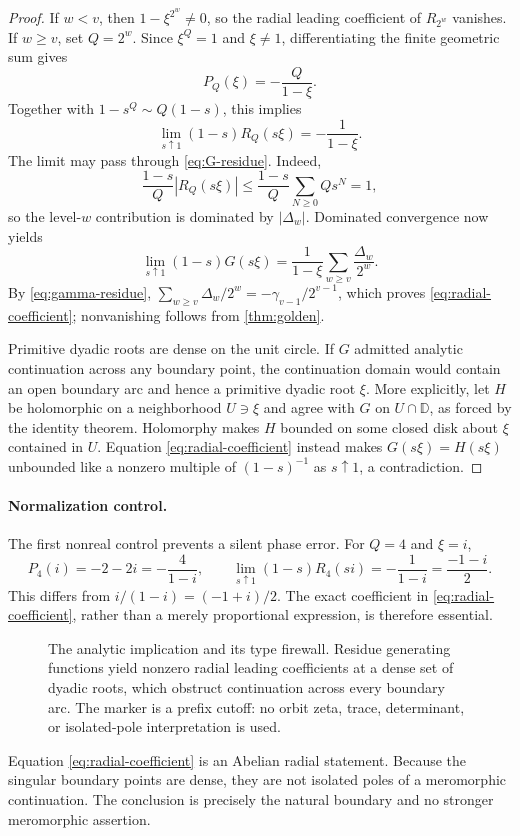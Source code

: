 \begin{proof}
If \(w<v\), then \(1-\xi^{2^w}\ne0\), so the radial leading coefficient
of \(R_{2^w}\) vanishes.  If \(w\ge v\), set \(Q=2^w\).  Since
\(\xi^Q=1\) and \(\xi\ne1\), differentiating the finite geometric sum gives
\[
  P_Q(\xi)=-\frac{Q}{1-\xi}.
\]
Together with \(1-s^Q\sim Q(1-s)\), this implies
\begin{equation}
  \lim_{s\uparrow1}(1-s)R_Q(s\xi)=-\frac1{1-\xi}.
  \label{eq:residue-radial}
\end{equation}
The limit may pass through \eqref{eq:G-residue}.  Indeed,
\[
  \frac{1-s}{Q}|R_Q(s\xi)|
  \le\frac{1-s}{Q}\sum_{N\ge0}Qs^N=1,
\]
so the level-\(w\) contribution is dominated by \(|\Delta_w|\).  Dominated
convergence now yields
\[
  \lim_{s\uparrow1}(1-s)G(s\xi)
  =\frac1{1-\xi}\sum_{w\ge v}\frac{\Delta_w}{2^w}.
\]
By \eqref{eq:gamma-residue},
\(\sum_{w\ge v}\Delta_w/2^w=-\gamma_{v-1}/2^{v-1}\), which proves
\eqref{eq:radial-coefficient}; nonvanishing follows from
\cref{thm:golden}.

Primitive dyadic roots are dense on the unit circle.  If \(G\) admitted
analytic continuation across any boundary point, the continuation domain
would contain an open boundary arc and hence a primitive dyadic root
\(\xi\).  More explicitly, let \(H\) be holomorphic on a neighborhood
\(U\ni\xi\) and agree with \(G\) on \(U\cap\mathbb D\), as forced by the
identity theorem.  Holomorphy makes \(H\) bounded on some closed disk about
\(\xi\) contained in \(U\).  Equation \eqref{eq:radial-coefficient} instead
makes \(G(s\xi)=H(s\xi)\) unbounded like a nonzero multiple of
\((1-s)^{-1}\) as \(s\uparrow1\), a contradiction.
\end{proof}

\paragraph{Normalization control.}
The first nonreal control prevents a silent phase error.  For \(Q=4\) and
\(\xi=i\),
\[
  P_4(i)=-2-2i=-\frac4{1-i},\qquad
  \lim_{s\uparrow1}(1-s)R_4(si)
  =-\frac1{1-i}=\frac{-1-i}{2}.
\]
This differs from \(i/(1-i)=(-1+i)/2\).  The exact coefficient in
\eqref{eq:radial-coefficient}, rather than a merely proportional
expression, is therefore essential.

\begin{figure}[t]
  \centering
  \resizebox{\textwidth}{!}{}
  \caption{The analytic implication and its type firewall.  Residue
  generating functions yield nonzero radial leading coefficients at a dense
  set of dyadic roots, which obstruct continuation across every boundary
  arc.  The marker is a prefix cutoff: no orbit zeta, trace, determinant, or
  isolated-pole interpretation is used.}
  \label{fig:radial-firewall}
\end{figure}

\begin{remark}
Equation \eqref{eq:radial-coefficient} is an Abelian radial statement.
Because the singular boundary points are dense, they are not isolated poles
of a meromorphic continuation.  The conclusion is precisely the natural
boundary and no stronger meromorphic assertion.
\end{remark}
